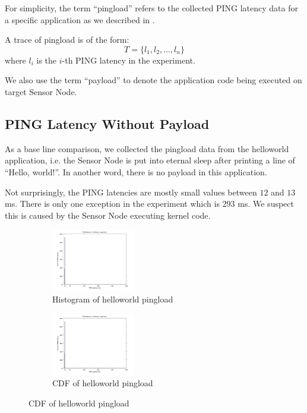 For simplicity, the term ``pingload'' refers to the collected PING latency data for a specific application as we described in .

\begin{definition}
	A trace of pingload is of the form:
	\begin{equation*}
		T=\{l_1, l_2, ..., l_n\}
	\end{equation*}
	where $l_i$ is the $i$-th PING latency in the experiment.
\end{definition}

We also use the term ``payload'' to denote the application code being executed on target Sensor Node.

\subsection{PING Latency Without Payload} \label{Sleep PINGLOAD}

As a base line comparison, we collected the pingload data from the helloworld application, i.e. the Sensor Node is put into eternal sleep after printing a line of ``Hello, world!''. In another word, there is no payload in this application.

Not surprisingly, the PING latencies are mostly small values between $12$ and $13$ ms. There is only one exception in the experiment which is $293$ ms. We suspect this is caused by the Sensor Node executing kernel code.

\begin{figure}
	\centering
	\begin{subfigure}[b]{0.5\textwidth}
		\centering
		\includegraphics[width=0.4\textwidth]{fig/sleepRI.png}
		\caption{Histogram of helloworld pingload}
	\end{subfigure}
	\begin{subfigure}[b]{0.5\textwidth}
		\centering
		\includegraphics[width=0.4\textwidth]{fig/sleepRI.png}
		\caption{CDF of helloworld pingload}
	\end{subfigure}
\end{figure}


